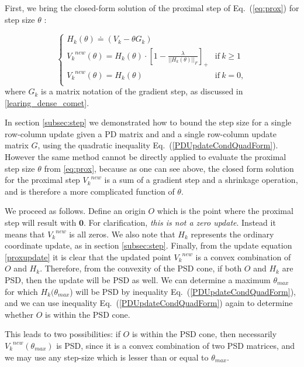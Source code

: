 \documentclass[twoside,11pt]{article}
\newcommand\mat[1]{{#1}}
\renewcommand\vec[1]{\mathbf{#1}}
\newcommand{\eqdef}{\doteq}
\newcommand{\Hk}{H_k}
\newcommand{\Vk}{\mat{V_k}}
\renewcommand{\eqref}[1]{Eq.~(\ref{#1})}
\begin{document}
First, we bring the closed-form solution of the proximal step of \eqref{eq:prox} for step size $\theta$ \citep{bach2012optimization}:

\begin{equation}\label{proxupdate}
 \begin{cases}
   H_k(\theta) \eqdef (V_k-\theta G_k) \\ 
   \Vk^{new} (\theta) = \Hk(\theta) \cdot [1 - \frac{\lambda}{||\Hk(\theta)||_F}]_+ & \text{if}\  k \geq 1\\
   \Vk^{new} (\theta) = \Hk(\theta) & \text{if}\ k = 0, \\ 
 \end{cases}
\end{equation}
where $G_k$ is a matrix notation of the gradient step, as discussed in \ref{learing_dense_comet}. 

In section \ref{subsec:step} we demonstrated how to bound the step size for a single row-column update given a PD matrix and and a single row-column update matrix $\mat{G}$, using the quadratic inequality \eqref{PDUpdateCondQuadForm}.
However the same method cannot be directly applied to evaluate the proximal step size $\theta$ from \ref{eq:prox}, because as one can see above, the closed form solution for the proximal step $\Vk^{new}$ is a sum of a gradient step and a shrinkage operation, and is therefore a more complicated function of $\theta$.

\newcommand{\Vkorigin}{\mat{O}}
We proceed as follows. Define an origin $\Vkorigin$ which is the point where the proximal step will result with $\vec{0}$. For clarification, \emph{this is not a zero update}. Instead it means that $\Vk^{new}$ is all zeros. We also note that $\Hk$ represents the ordinary coordinate update, as in section \ref{subsec:step}. Finally, from the update equation \ref{proxupdate} it is clear that the updated point $\Vk^{new}$ is a convex combination of $\Vkorigin$ and $\Hk$. Therefore, from the convexity of the PSD cone, if both $\Vkorigin$ and $\Hk$ are PSD, then the update will be PSD as well. We can determine a maximum $\theta_{max}$ for which $\Hk(\theta_{max}$) will be PSD by inequality \eqref{PDUpdateCondQuadForm}, and we can use inequality \eqref{PDUpdateCondQuadForm} again to determine whether $\Vkorigin$ is within the PSD cone.

This leads to two possibilities: if $\Vkorigin$ is within the PSD cone, then necessarily $\Vk^{new} (\theta_{max})$ is PSD, since it is a convex combination of two PSD matrices, and we may use any step-size which is lesser than or equal to $\theta_{max}$.
\end{document}
